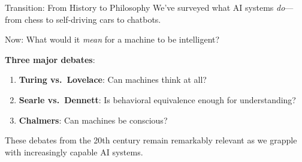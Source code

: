 ﻿\documentclass[aspectratio=169,11pt]{beamer}
\begin{document}
\begin{frame}{Transition: From History to Philosophy}
We've surveyed what AI systems \emph{do}---from chess to self-driving cars to chatbots.

\vspace{0.3em}
Now: What would it \emph{mean} for a machine to be intelligent?

\vspace{0.3em}
\textbf{Three major debates}:
\begin{enumerate}
    \item \textbf{Turing vs.\ Lovelace}: Can machines think at all?
    \item \textbf{Searle vs.\ Dennett}: Is behavioral equivalence enough for understanding?
    \item \textbf{Chalmers}: Can machines be conscious?
\end{enumerate}

\vspace{0.3em}
These debates from the 20th century remain remarkably relevant as we grapple with increasingly capable AI systems.
\end{frame}
\end{document}
